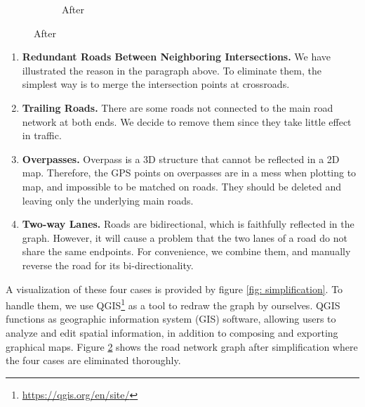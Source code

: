 \begin{figure}[htb]
\begin{subfigure}[t]{0.45\linewidth}
      \caption{After}
      \label{fig: graph_after}
  \end{subfigure}
\end{figure}

\begin{enumerate}
  \item \textbf{Redundant Roads Between Neighboring Intersections.} We have illustrated the reason in the paragraph above. To eliminate them, the simplest way is to merge the intersection points at crossroads.
  \item \textbf{Trailing Roads.} There are some roads not connected to the main road network at both ends. We decide to remove them since they take little effect in traffic.
  \item \textbf{Overpasses.} Overpass is a 3D structure that cannot be reflected in a 2D map. Therefore, the GPS points on overpasses are in a mess when plotting to map, and impossible to be matched on roads. They should be deleted and leaving only the underlying main roads.
  \item \textbf{Two-way Lanes.} Roads are bidirectional, which is faithfully reflected in the graph. However, it will cause a problem that the two lanes of a road do not share the same endpoints. For convenience, we combine them, and manually reverse the road for its bi-directionality.
\end{enumerate}

A visualization of these four cases is provided by figure \ref{fig: simplification}. To handle them, we use QGIS\footnote{\href{https://qgis.org/en/site/}{https://qgis.org/en/site/}} as a tool to redraw the graph by ourselves. QGIS functions as geographic information system (GIS) software, allowing users to analyze and edit spatial information, in addition to composing and exporting graphical maps. Figure \ref{fig: graph_after} shows the road network graph after simplification where the four cases are eliminated thoroughly.

